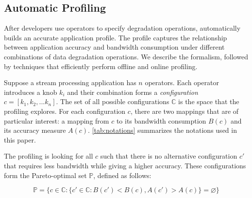 \subsection{Automatic Profiling}
\label{sec:automatic-profiling}

After developers use \maybe{} operators to specify degradation operations,
\sysname{} automatically builds an accurate application profile. The profile
captures the relationship between application accuracy and bandwidth consumption
under different combinations of data degradation operations. We describe the
formalism, followed by techniques that efficiently perform offline and online
profiling.

 Suppose a stream processing application has $n$
\maybe{} operators. Each operator introduces a knob $k_i$ and their combination
forms a \textit{configuration} $c = [k_{1}, k_{2}, ... k_{n}]$. The set of all
possible configurations $\mathbb{C}$ is the space that the profiling
explores. For each configuration $c$, there are two mappings that are of
particular interest: a mapping from $c$ to its bandwidth consumption $B(c)$ and
its accuracy measure $A(c)$. \autoref{tab:notations} summarizes the notations
used in this paper.

The profiling is looking for all $c$ such that there is no alternative
configuration $c'$ that requires less bandwidth while giving a higher
accuracy. These configurations form the Pareto-optimal set $\mathbb{P}$, defined
as follows:

{\small \vspace{-1em}
  \begin{equation}
  \mathbb{P} = \{ c \in \mathbb{C} : \{ c' \in \mathbb{C}: B(c') < B(c),
  A(c') > A(c) \} = \varnothing\}
  \label{eq:pareto}
\end{equation}
}%

